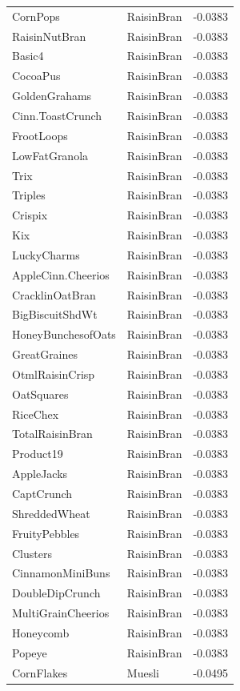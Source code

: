 \begin{longtable}{llr}
CornPops & RaisinBran & -0.0383 \\
RaisinNutBran & RaisinBran & -0.0383 \\
Basic4 & RaisinBran & -0.0383 \\
CocoaPus & RaisinBran & -0.0383 \\
GoldenGrahams & RaisinBran & -0.0383 \\
Cinn.ToastCrunch & RaisinBran & -0.0383 \\
FrootLoops & RaisinBran & -0.0383 \\
LowFatGranola & RaisinBran & -0.0383 \\
Trix & RaisinBran & -0.0383 \\
Triples & RaisinBran & -0.0383 \\
Crispix & RaisinBran & -0.0383 \\
Kix & RaisinBran & -0.0383 \\
LuckyCharms & RaisinBran & -0.0383 \\
AppleCinn.Cheerios & RaisinBran & -0.0383 \\
CracklinOatBran & RaisinBran & -0.0383 \\
BigBiscuitShdWt & RaisinBran & -0.0383 \\
HoneyBunchesofOats & RaisinBran & -0.0383 \\
GreatGraines & RaisinBran & -0.0383 \\
OtmlRaisinCrisp & RaisinBran & -0.0383 \\
OatSquares & RaisinBran & -0.0383 \\
RiceChex & RaisinBran & -0.0383 \\
TotalRaisinBran & RaisinBran & -0.0383 \\
Product19 & RaisinBran & -0.0383 \\
AppleJacks & RaisinBran & -0.0383 \\
CaptCrunch & RaisinBran & -0.0383 \\
ShreddedWheat & RaisinBran & -0.0383 \\
FruityPebbles & RaisinBran & -0.0383 \\
Clusters & RaisinBran & -0.0383 \\
CinnamonMiniBuns & RaisinBran & -0.0383 \\
DoubleDipCrunch & RaisinBran & -0.0383 \\
MultiGrainCheerios & RaisinBran & -0.0383 \\
Honeycomb & RaisinBran & -0.0383 \\
Popeye & RaisinBran & -0.0383 \\
CornFlakes & Muesli & -0.0495 \\

\end{longtable}
